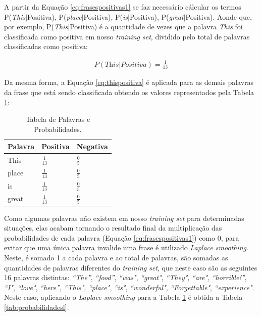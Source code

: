 A partir da Equação \ref{eq:frasespositivas1} se faz necessário cálcular os
termos P(\textit{This}$\vert$Positiva),
P(\textit{place}$\vert$Positiva), P(\textit{is}$\vert$Positiva), P(\textit{great}$\vert$Positiva).
Aonde que, por exemplo, P(\textit{This}$\vert$Positiva) é a quantidade de vezes
que a palavra \textit{This} foi classificada como positiva em nosso
\textit{training set}, dividido pelo total de palavras classificadas como positiva:

\begin{equation}
\begin{gathered}
P(\textit{This}|Positiva) = \frac{1}{13}
\label{eq:thispositiva}
\end{gathered}
\end{equation}


Da mesma forma, a Equação \ref{eq:thispositiva} é aplicada para as demais
palavras da frase que está sendo classificada obtendo os valores representados
pela Tabela \ref{tab:probabilidadesnb}:

\newpage
\begin{table}[htb]
\centering
\renewcommand{\arraystretch}{1.5}%
\begin{tabular}{lll}
\hline

Palavra & Positiva & Negativa \\ \hline
This & \large $\frac{1}{13}$ & \large $\frac{0}{5}$ \\
place & \large $\frac{1}{13}$ & \large $\frac{0}{5}$ \\
is & \large $\frac{1}{13}$ & \large $\frac{0}{5}$ \\
great & \large $\frac{1}{13}$ & \large $\frac{0}{5}$ \\
\end{tabular}
\caption{Tabela de Palavras e Probabilidades.}
\label{tab:probabilidadesnb}
\end{table}

Como algumas palavras não existem em nosso \textit{training set} para
determinadas situações, elas acabam tornando o resultado final da multiplicação
das probabilidades de cada palavra (Equação \ref{eq:frasespositivas1}) como 0,
para evitar que uma única palavra invalide uma frase é utilizado \textit{Laplace smoothing}. Neste, é somado
1 a cada palavra e ao total de palavras, são somadas as quantidades de palavras diferentes do \textit{training set}, que neste caso são
as seguintes 16 palavras distintas: \textit{``The''}, \textit{``food''},
\textit{``was"}, \textit{``great"}, \textit{``They"}, \textit{``are"},
\textit{``horrible!''}, \textit{``I"}, \textit{``love"}, \textit{``here''},
\textit{``This"}, \textit{``place"}, \textit{``is"}, \textit{``wonderful"},
\textit{``Forgettable"}, \textit{``experience"}. Neste caso, aplicando o
\textit{Laplace smoothing} para a Tabela \ref{tab:probabilidadesnb} é obtida a
Tabela \ref{tab:probabilidadesl}.


